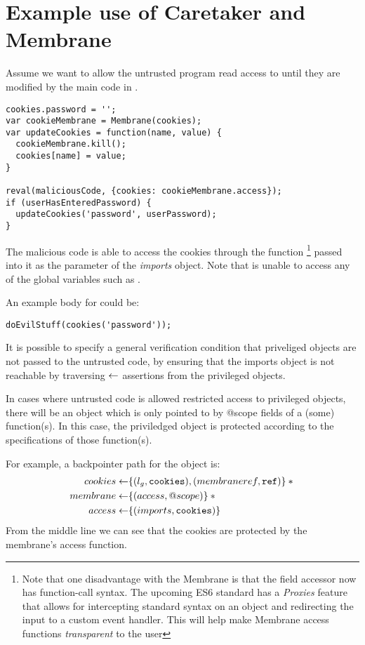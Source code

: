 \documentclass[a4paper,notitlepage]{report}
\begin{document}
\section{Example use of Caretaker and Membrane}
Assume we want to allow the untrusted program read access to  until
they are modified by the main code in .

\begin{verbatim}
cookies.password = '';
var cookieMembrane = Membrane(cookies);
var updateCookies = function(name, value) {
  cookieMembrane.kill();
  cookies[name] = value;
}

reval(maliciousCode, {cookies: cookieMembrane.access});
if (userHasEnteredPassword) {
  updateCookies('password', userPassword);
}
\end{verbatim}

The malicious code is able to access the cookies through the
 function%
\footnote{
  Note that one disadvantage with the Membrane is that the field accessor now has
  function-call syntax. The upcoming ES6 standard has a \emph{Proxies} feature
  that allows for intercepting standard syntax on an object and redirecting the
  input to a custom event handler. This will help make Membrane access functions
  \emph{transparent} to the user
}
passed into it as the  parameter of the \emph{imports} object.
Note that  is unable to access any of the global variables
such as .

An example body for  could be:
\begin{verbatim}doEvilStuff(cookies('password'));\end{verbatim}

It is possible to specify a general verification condition that priveliged
objects are not passed to the untrusted code, by ensuring that the imports
object is not reachable by traversing $\leftarrow$ assertions from the privileged
objects.

In cases where untrusted code is allowed restricted access to privileged
objects, there will be an object which is only pointed to by @scope fields
of a (some) function(s). In this case, the priviledged object is protected
according to the specifications of those function(s).

For example, a backpointer path for the  object is:
\begin{align*}
  cookies \leftarrow & \{(l_g, \mathtt{cookies}), (membraneref, \mathtt{ref})\} \mathbin{*} {} \\
  membrane \leftarrow & \{(access, @scope)\} \mathbin{*} {} \\
  access \leftarrow & \{(imports, \mathtt{cookies})\}
\end{align*}
From the middle line we can see that the cookies are protected by the membrane's
access function.
\end{document}

